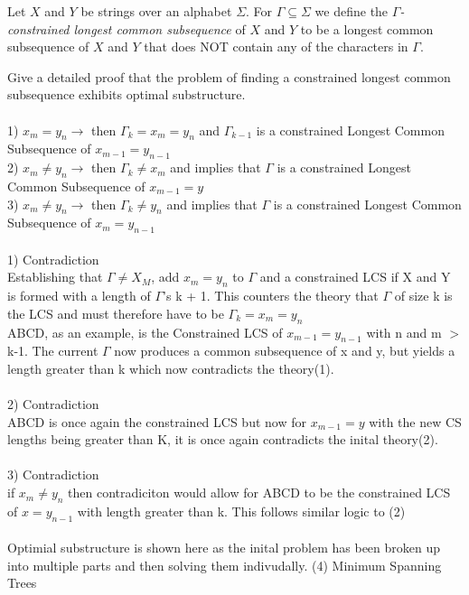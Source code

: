 \documentclass[11pt]{amsart}
\begin{document}
Let $X$ and $Y$ be strings over an alphabet $\Sigma$. For $\Gamma\subseteq \Sigma$ we define the \emph{$\Gamma$-constrained longest common subsequence } of $X$ and $Y$ to be a longest common subsequence of $X$ and $Y$ that does NOT 
contain any of the characters in $\Gamma$.\medskip

Give a detailed proof that the problem of finding a constrained longest common subsequence exhibits optimal substructure.\\\\
1) $x_m = y_n \rightarrow$ then $\Gamma_k = x_m = y_n$ and $\Gamma_{k-1}$ is a constrained Longest Common Subsequence of $x_{m-1} = y_{n-1}$
\\
2) $x_m \neq y_n \rightarrow$ then $\Gamma_k \neq x_m$ and implies that $\Gamma$ is a constrained Longest Common Subsequence of $x_{m-1} = y$
\\
3) $x_m \neq y_n \rightarrow$ then $\Gamma_k \neq y_n$ and implies that $\Gamma$ is a constrained Longest Common Subsequence of $x_m = y_{n-1}$
\\\\
1)
Contradiction\\
Establishing that $\Gamma \neq X_M$, add $x_m = y_n$ to $\Gamma$ and a constrained LCS if X and Y is formed with a length of $\Gamma$'s k + 1. This counters the theory that $\Gamma$ of size k is the LCS and must therefore have to be $\Gamma_k = x_m = y_n$\\ABCD, as an example, is the Constrained LCS of $x_{m-1} = y_{n-1}$ with n and m $>$ k-1. The current $\Gamma$ now produces a common subsequence of x and y, but yields a length greater than k which now contradicts the theory(1).
\\\\
2)
Contradiction\\
ABCD is once again the constrained LCS but now for $x_{m-1} = y$ with the new CS lengths being greater than K, it is once again contradicts the inital theory(2).
\\\\
3)
Contradiction\\
if $x_m \neq y_n$ then contradiciton would allow for ABCD to be the constrained LCS of $x = y_{n-1}$ with length greater than k. This follows similar logic to (2)
\\\\
Optimial substructure is shown here as the inital problem has been broken up into multiple parts and then solving them indivudally. 
\newpage
(4) Minimum Spanning Trees\medskip
\end{document}
